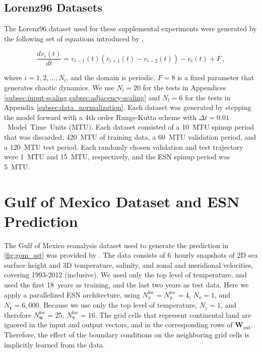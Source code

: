 \documentclass[draft]{agujournal2019}
\newcommand{\state}{\mathbf{v}}
\newcommand{\hidden}{\mathbf{r}}
\newcommand{\inputstate}{\mathbf{u}}
\newcommand{\Wout}{\mathbf{W}_\text{out}}
\newcommand{\nstate}{N_{\state}}
\newcommand{\nhidden}{N_{\hidden}}
\newcommand{\ninputstate}{N_{\inputstate}}
\newcommand{\nx}{N_{x}}
\newcommand{\ny}{N_{y}}
\newcommand{\nvertical}{N_{z}}
\newcommand{\noverlap}{N_{o}}
\newcommand{\nlocalstate}{\nstate^\text{loc}}
\newcommand{\nlocalinputstate}{\ninputstate^\text{loc}}
\newcommand{\nlocalx}{\nx^\text{loc}}
\newcommand{\nlocaly}{\ny^\text{loc}}
\newcommand{\citet}{\citeA}
\begin{document}
\subsection{Lorenz96 Datasets}
\label{subsec:lorenz96}

The Lorenz96 dataset used for these supplemental experiments were generated by
the following set of equations introduced by \citet{lorenz_predictability_1996},
\begin{linenomath*}\begin{equation*}
    \frac{dv_i(t)}{dt} = v_{i-1}(t)(v_{i+1}(t) - v_{i-2}(t)) - v_i(t) + F \, ,
    \label{eq:lorenz96}
\end{equation*}\end{linenomath*}
where $i=1,2,...,N_{l}$, and the domain is periodic.
$F=8$ is a fixed parameter that generates chaotic dynamics.
We use $N_l = 20$ for the tests in
Appendices \cref{subsec:input-scaling,subsec:adjacency-scaling} and $N_l = 6$ for the tests
in Appendix \cref{subsec:data_normalization}.
Each dataset was generated by stepping the model forward with a 4th order
Runge-Kutta scheme with $\Delta t = 0.01$~Model~Time~Units (MTU).
Each dataset consisted of a 10~MTU spinup period that was discarded, 420~MTU of
training data, a 60~MTU validation period, and a 120~MTU test
period.
Each randomly chosen validation and test trajectory were 1~MTU and 15~MTU,
respectively, and the ESN spinup period was 5~MTU.


\section{Gulf of Mexico Dataset and ESN Prediction}
\label{sec:gom}

The Gulf of Mexico reanalysis dataset used to generate the prediction in
\cref{fig:gom_sst} was provided by \citet{gom_dataset}.
The data consists of 6~hourly snapshots of 2D sea surface height and 3D
temperature, salinity, and zonal and meridional velocities,
covering 1993-2012 (inclusive).
We used only the top level of temperature, and used the first 18~years as
training, and the last two years as test data.
Here we apply a parallelized ESN architecture, using
$\nlocalx=\nlocaly=4$, $\noverlap=1$, and $\nhidden=6,000$.
Because we use only the top level of temperature, $\nvertical=1$, and therefore
$\nlocalinputstate=25$, $\nlocalstate=16$.
The grid cells that represent continental land are ignored in the input and
output vectors, and in the corresponding rows of $\Wout$.
Therefore, the effect of the boundary conditions on the neighboring grid cells
is implicitly learned from the data.
\end{document}
